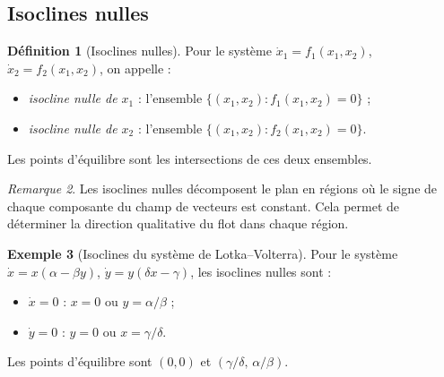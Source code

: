 \documentclass[12pt,a4paper,openany]{book}
\theoremstyle{definition}
\newtheorem{definition}{Définition}[chapter]
\newtheorem{exemple}[definition]{Exemple}
\theoremstyle{plain}
\theoremstyle{remark}
\newtheorem{remarque}[definition]{Remarque}
\begin{document}
\subsection{Isoclines nulles}
\label{subsec:isoclines}

\begin{definition}[Isoclines nulles]
\label{def:isoclines}
Pour le système $\dot{x}_1 = f_1(x_1, x_2)$,
$\dot{x}_2 = f_2(x_1, x_2)$, on appelle :
\begin{itemize}
  \item \emph{isocline nulle de $x_1$} : l'ensemble
        $\{(x_1, x_2) : f_1(x_1, x_2) = 0\}$ ;
  \item \emph{isocline nulle de $x_2$} : l'ensemble
        $\{(x_1, x_2) : f_2(x_1, x_2) = 0\}$.
\end{itemize}
Les points d'équilibre sont les intersections de ces deux ensembles.
\end{definition}

\begin{remarque}
Les isoclines nulles décomposent le plan en régions où le signe de
chaque composante du champ de vecteurs est constant. Cela permet de
déterminer la direction qualitative du flot dans chaque région.
\end{remarque}

\begin{exemple}[Isoclines du système de Lotka--Volterra]
\label{ex:isoclines-LV}
Pour le système $\dot{x} = x(\alpha - \beta y)$,
$\dot{y} = y(\delta x - \gamma)$, les isoclines nulles sont :
\begin{itemize}
  \item $\dot{x} = 0$ : $x = 0$ ou $y = \alpha/\beta$ ;
  \item $\dot{y} = 0$ : $y = 0$ ou $x = \gamma/\delta$.
\end{itemize}
Les points d'équilibre sont $(0,0)$ et
$(\gamma/\delta,\, \alpha/\beta)$.
\end{exemple}

\begin{center}
\end{center}
\end{document}
